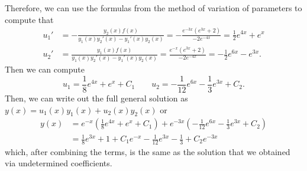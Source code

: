 \documentclass{ximera}
\begin{document}
\begin{exampleSol}
    Therefore, we can use the formulas from the method of variation of parameters to compute that
    \begin{equation*}
        \begin{split}
            u_1' &= -\frac{y_2(x)f(x)}{y_1(x)y_2'(x) - y_1'(x)y_2(x)} = -\frac{e^{-3x}(e^{3x} + 2)}{-2e^{-4x}} = \frac{1}{2}e^{4x} + e^x \\
            u_2' &= \frac{y_1(x)f(x)}{y_1(x)y_2'(x) - y_1'(x)y_2(x)} = \frac{e^{-x}(e^{3x} + 2)}{-2e^{-4x}} = -\frac{1}{2}e^{6x} - e^{3x}.
        \end{split}
    \end{equation*} 
    Then we can compute
    \begin{equation*}
        u_1 = \frac{1}{8}e^{4x} + e^x + C_1 \qquad u_2 = -\frac{1}{12}e^{6x} - \frac{1}{3}e^{3x} + C_2.
    \end{equation*}
    Then, we can write out the full general solution as $y(x) = u_1(x)y_1(x) + u_2(x)y_2(x)$ or
    \begin{equation*}
        \begin{split}
            y(x) &= e^{-x}\left( \frac{1}{8}e^{4x} + e^x + C_1 \right) + e^{-3x}\left(-\frac{1}{12}e^{6x} - \frac{1}{3}e^{3x} + C_2 \right) \\
            &= \frac{1}{8}e^{3x} + 1 + C_1e^{-x} - \frac{1}{12}e^{3x} - \frac{1}{3} + C_2e^{-3x}
        \end{split}
    \end{equation*}
    which, after combining the terms, is the same as the solution that we obtained via undetermined coefficients.
\end{exampleSol}
\end{document}
